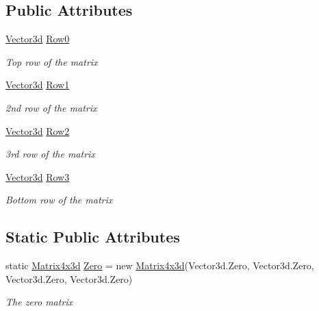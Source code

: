 \subsection*{Public Attributes}
\begin{DoxyCompactItemize}
\item 
\hyperlink{struct_open_t_k_1_1_vector3d}{Vector3d} \hyperlink{struct_open_t_k_1_1_matrix4x3d_a9036054fe57e4af439e4f14baf2753d9}{Row0}
\begin{DoxyCompactList}\small\item\em Top row of the matrix \end{DoxyCompactList}\item 
\hyperlink{struct_open_t_k_1_1_vector3d}{Vector3d} \hyperlink{struct_open_t_k_1_1_matrix4x3d_a7fb162bd9a4a2733c6f8553250232d9a}{Row1}
\begin{DoxyCompactList}\small\item\em 2nd row of the matrix \end{DoxyCompactList}\item 
\hyperlink{struct_open_t_k_1_1_vector3d}{Vector3d} \hyperlink{struct_open_t_k_1_1_matrix4x3d_aab272f11a5daf4a0757b636f04dfed30}{Row2}
\begin{DoxyCompactList}\small\item\em 3rd row of the matrix \end{DoxyCompactList}\item 
\hyperlink{struct_open_t_k_1_1_vector3d}{Vector3d} \hyperlink{struct_open_t_k_1_1_matrix4x3d_a89ec663e1396246b8c5a6b13a5d58c7e}{Row3}
\begin{DoxyCompactList}\small\item\em Bottom row of the matrix \end{DoxyCompactList}\end{DoxyCompactItemize}
\subsection*{Static Public Attributes}
\begin{DoxyCompactItemize}
\item 
static \hyperlink{struct_open_t_k_1_1_matrix4x3d}{Matrix4x3d} \hyperlink{struct_open_t_k_1_1_matrix4x3d_a3bff6f1b3685cebfc633a3b7372a692b}{Zero} = new \hyperlink{struct_open_t_k_1_1_matrix4x3d}{Matrix4x3d}(Vector3d.\-Zero, Vector3d.\-Zero, Vector3d.\-Zero, Vector3d.\-Zero)
\begin{DoxyCompactList}\small\item\em The zero matrix \end{DoxyCompactList}\end{DoxyCompactItemize}
